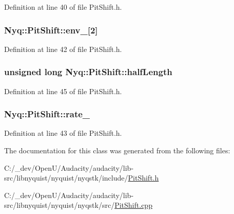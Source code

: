 Definition at line 40 of file Pit\+Shift.\+h.

\subsubsection[{\texorpdfstring{env\+\_\+}{env_}}]{ Nyq\+::\+Pit\+Shift\+::env\+\_\+\mbox{[}2\mbox{]}\hspace{0.3cm}{\ttfamily [protected]}}\hypertarget{class_nyq_1_1_pit_shift_a51df5294bf6aff002c474470f833f014}{}\label{class_nyq_1_1_pit_shift_a51df5294bf6aff002c474470f833f014}


Definition at line 42 of file Pit\+Shift.\+h.

\subsubsection[{\texorpdfstring{half\+Length}{halfLength}}]{\setlength{\rightskip}{0pt plus 5cm}unsigned long Nyq\+::\+Pit\+Shift\+::half\+Length\hspace{0.3cm}{\ttfamily [protected]}}\hypertarget{class_nyq_1_1_pit_shift_a73b9629d4c1ee9bd2f120f360715dd01}{}\label{class_nyq_1_1_pit_shift_a73b9629d4c1ee9bd2f120f360715dd01}


Definition at line 45 of file Pit\+Shift.\+h.

\subsubsection[{\texorpdfstring{rate\+\_\+}{rate_}}]{ Nyq\+::\+Pit\+Shift\+::rate\+\_\+\hspace{0.3cm}{\ttfamily [protected]}}\hypertarget{class_nyq_1_1_pit_shift_a1ca53d086a62211042e0bf9117bddb2d}{}\label{class_nyq_1_1_pit_shift_a1ca53d086a62211042e0bf9117bddb2d}


Definition at line 43 of file Pit\+Shift.\+h.



The documentation for this class was generated from the following files\+:\begin{DoxyCompactItemize}
\item 
C\+:/\+\_\+dev/\+Open\+U/\+Audacity/audacity/lib-\/src/libnyquist/nyquist/nyqstk/include/\hyperlink{_pit_shift_8h}{Pit\+Shift.\+h}\item 
C\+:/\+\_\+dev/\+Open\+U/\+Audacity/audacity/lib-\/src/libnyquist/nyquist/nyqstk/src/\hyperlink{_pit_shift_8cpp}{Pit\+Shift.\+cpp}\end{DoxyCompactItemize}

